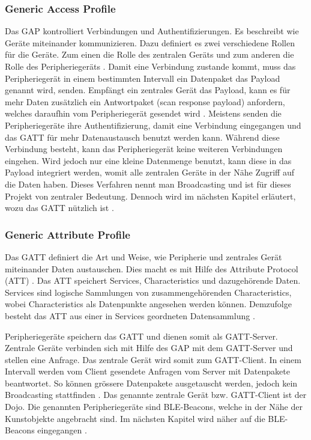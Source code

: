 \subsubsection{Generic Access Profile}
Das GAP kontrolliert Verbindungen und Authentifizierungen. Es beschreibt wie Geräte miteinander kommunizieren. Dazu definiert es zwei verschiedene Rollen für die Geräte. Zum einen die Rolle des zentralen Geräts und zum anderen die Rolle des Peripheriegeräts \cite{7_Teildokument_BT}. Damit eine Verbindung zustande kommt, muss das Peripheriegerät in einem bestimmten Intervall ein Datenpaket das Payload genannt wird, senden. Empfängt ein zentrales Gerät das Payload, kann es für mehr Daten zusätzlich ein Antwortpaket (scan response payload) anfordern, welches daraufhin vom Peripheriegerät gesendet wird \cite{7_Teildokument_BT}. Meistens senden die Peripheriegeräte ihre Authentifizierung, damit eine Verbindung eingegangen und das GATT für mehr Datenaustausch benutzt werden kann. Während diese Verbindung besteht, kann das Peripheriegerät keine weiteren Verbindungen eingehen. Wird jedoch nur eine kleine Datenmenge benutzt, kann diese in das Payload integriert werden, womit alle zentralen Geräte in der Nähe Zugriff auf die Daten haben. Dieses Verfahren nennt man Broadcasting und ist für dieses Projekt von zentraler Bedeutung. Dennoch wird im nächsten Kapitel erläutert, wozu das GATT nützlich ist \cite{7_Teildokument_BT}.

\subsubsection{Generic Attribute Profile}
Das GATT definiert die Art und Weise, wie Peripherie und zentrales Gerät miteinander Daten austauschen. Dies macht es mit Hilfe des Attribute Protocol (ATT) \cite{8_Teildokument_BT}. Das ATT speichert Services, Characteristics und dazugehörende Daten. Services sind logische Sammlungen von zusammengehörenden Characteristics, wobei Characteristics als Datenpunkte angesehen werden können. Demzufolge besteht das ATT aus einer in Services geordneten Datensammlung \cite{8_Teildokument_BT}.

Peripheriegeräte speichern das GATT und dienen somit als GATT-Server. Zentrale Geräte verbinden sich mit Hilfe des GAP mit dem GATT-Server und stellen eine Anfrage. Das zentrale Gerät wird somit zum GATT-Client. In einem Intervall werden vom Client gesendete Anfragen vom Server mit Datenpakete beantwortet. So können grössere Datenpakete ausgetauscht werden, jedoch kein Broadcasting stattfinden \cite{8_Teildokument_BT}. Das genannte zentrale Gerät bzw. GATT-Client ist der Dojo. Die genannten Peripheriegeräte sind BLE-Beacons, welche in der Nähe der Kunstobjekte angebracht sind. Im nächsten Kapitel wird näher auf die BLE-Beacons eingegangen \cite{8_Teildokument_BT}.

